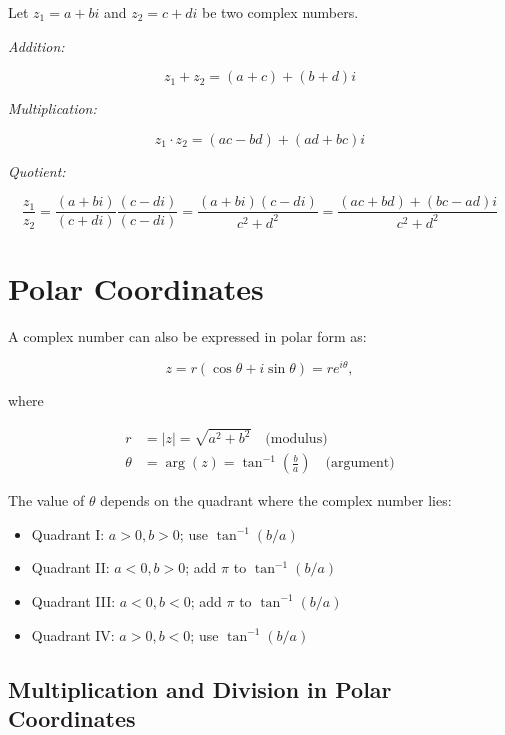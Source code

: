Let \( z_1 = a + bi \) and \( z_2 = c + di \) be two complex numbers.

\emph{Addition:}

\[ 
	z_1 + z_2 = (a + c) + (b + d)i
\]

\emph{Multiplication:}
	      
\[
	z_1 \cdot z_2 = (ac - bd) + (ad + bc)i
\]

\emph{Quotient:}
	      
\[
	\frac{z_1}{z_2} = \frac{(a + bi)}{(c + di)} \frac{(c - di)}{(c - di)} = \frac{(a + bi)(c - di)}
	{c^2 + d^2} = \frac{(ac + bd) + (bc - ad)i}{c^2 + d^2}
\]

\section{Polar Coordinates}

A complex number can also be expressed in polar form as:

\[
	z = r(\cos \theta + i \sin \theta) = re^{i\theta},
\]

where

\begin{align*}
	r      & = |z| = \sqrt{a^2 + b^2} \quad \text{(modulus)}                       \\
	\theta & = \arg(z) = \tan^{-1}\left(\frac{b}{a}\right) \quad \text{(argument)}
\end{align*}

The value of \( \theta \) depends on the quadrant where the complex number lies:

\begin{itemize}
	
	\item Quadrant I: \( a > 0, b > 0 \); use \( \tan^{-1}(b/a) \)
	
	\item Quadrant II: \( a < 0, b > 0 \); add \( \pi \) to \( \tan^{-1}(b/a) \)
	
	\item Quadrant III: \( a < 0, b < 0 \); add \( \pi \) to \( \tan^{-1}(b/a) \)
	
	\item Quadrant IV: \( a > 0, b < 0 \); use \( \tan^{-1}(b/a) \)

\end{itemize}

\subsection{Multiplication and Division in Polar Coordinates}

